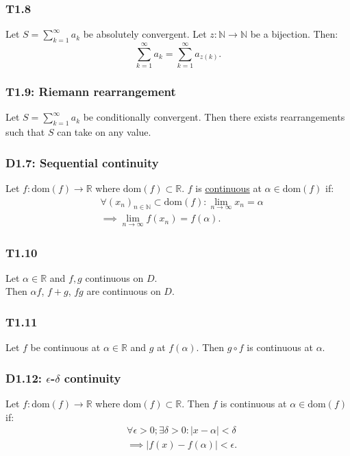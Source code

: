 \documentclass{article}
\begin{document}
\begin{multicols*}{3}
\subsubsection*{T1.8}
Let $\displaystyle S=\sum_{k=1}^{\infty}a_k$
be absolutely convergent. Let $z:\mathbb{N}
\rightarrow\mathbb{N}$ be a bijection. Then:
$$\sum_{k=1}^{\infty}a_k
=\sum_{k=1}^{\infty}a_{z(k)}.$$

\subsubsection*{T1.9: Riemann rearrangement}
Let $\displaystyle S=\sum_{k=1}^{\infty}a_k$
be conditionally convergent. Then there exists rearrangements
such that $S$ can take on any value.

\subsubsection*{D1.7: Sequential continuity}
Let $f:\text{dom}(f)\rightarrow\mathbb{R}$
where $\text{dom}(f)\subset\mathbb{R}$.
$f$ is \underline{continuous} at $\alpha\in\text{dom}(f)$ if:
\begin{align*}
    &\forall(x_n)_{n\in\mathbb{N}}\subset\text{dom}(f):
    \lim_{n\rightarrow\infty}x_n=\alpha \\
    &\implies\lim_{n\rightarrow\infty}f(x_n)=f(\alpha).
\end{align*}

\subsubsection*{T1.10}
Let $\alpha\in\mathbb{R}$ and $f,g$ continuous on $D$. \\
Then $\alpha f$, $f+g$, $fg$ are continuous on $D$.

\subsubsection*{T1.11}
Let $f$ be continuous at $\alpha\in\mathbb{R}$
and $g$ at $f(\alpha)$.
Then $g\circ f$ is continuous at $\alpha$.

\subsubsection*{D1.12: $\epsilon$-$\delta$ continuity}
Let $f:\text{dom}(f)\rightarrow\mathbb{R}$
where $\text{dom}(f)\subset\mathbb{R}$.
Then $f$ is continuous at $\alpha\in\text{dom}(f)$ if:
\begin{align*}
    &\forall\epsilon>0;\exists\delta>0:
    |x-\alpha|<\delta \\
    &\implies
    |f(x)-f(\alpha)|<\epsilon.
\end{align*}


\end{multicols*}
\end{document}
